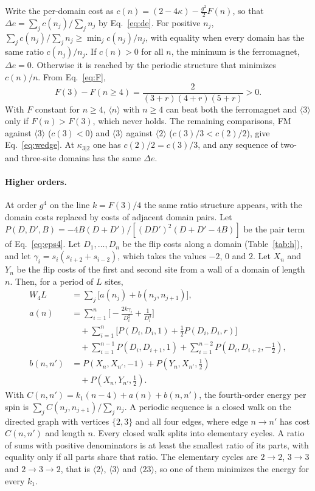 \documentclass[
 aps,prb,
 twocolumn,
 superscriptaddress,
 longbibliography,
 nofootinbib,
 floatfix
]{revtex4-2}
\begin{document}
Write the per-domain cost as $c(n)=(2-4\kappa)-\tfrac{g^2}{2}F(n)$, so that
$\Delta e=\sum_jc(n_j)/\sum_jn_j$ by Eq.~\eqref{eq:de}. For positive $n_j$,
$\sum_jc(n_j)/\sum_jn_j\ge\min_jc(n_j)/n_j$, with equality when every domain has the same ratio
$c(n_j)/n_j$. If $c(n)>0$ for all $n$, the minimum is the ferromagnet, $\Delta e=0$. Otherwise it is
reached by the periodic structure that minimizes $c(n)/n$. From Eq.~\eqref{eq:F},
\begin{equation}
F(3)-F(n\ge4)=\frac{2}{(3+r)(4+r)(5+r)}>0 .
\end{equation}
With $F$ constant for $n\ge4$, $\langle n\rangle$ with $n\ge4$ can beat both the ferromagnet and
$\langle3\rangle$ only if $F(n)>F(3)$, which never holds. The remaining comparisons, FM against
$\langle3\rangle$ ($c(3)<0$) and $\langle3\rangle$ against $\langle2\rangle$
($c(3)/3<c(2)/2$), give Eq.~\eqref{eq:wedge}. At $\kappa_{3|2}$ one has $c(2)/2=c(3)/3$, and any
sequence of two- and three-site domains has the same $\Delta e$.

\paragraph*{Higher orders.}
At order $g^4$ on the line $k=F(3)/4$ the same ratio structure appears, with the domain costs replaced by
costs of adjacent domain pairs. Let $P(D,D',B)=-4B(D+D')/[(DD')^2(D+D'-4B)]$ be the pair term of
Eq.~\eqref{eq:eps4}. Let $D_1,\dots,D_n$ be the flip costs along a domain (Table~\ref{tab:h}), and let
$\gamma_i=s_i(s_{i+2}+s_{i-2})$, which takes the values $-2$, $0$ and $2$. Let $X_n$ and $Y_n$ be the flip costs of
the first and second site from a wall of a domain of length $n$. Then, for a period of $L$ sites,
\begin{align}
W_4L&=\sum_j\big[a(n_j)+b(n_j,n_{j+1})\big],\nonumber\\
a(n)&=\sum_{i=1}^{n}\Big[-\frac{2k\gamma_i}{D_i^2}+\frac1{D_i^3}\Big]\nonumber\\
&\quad+\sum_{i=1}^{n}\Big[P(D_i,D_i,1)+\tfrac12P(D_i,D_i,r)\Big]\nonumber\\
&\quad+\sum_{i=1}^{n-1}P(D_i,D_{i+1},1)+\sum_{i=1}^{n-2}P(D_i,D_{i+2},-\tfrac12),\nonumber\\
b(n,n')&=P(X_n,X_{n'},-1)+P(Y_n,X_{n'},\tfrac12)\nonumber\\
&\quad+P(X_n,Y_{n'},\tfrac12).
\label{eq:ab}
\end{align}
With $C(n,n')=k_1(n-4)+a(n)+b(n,n')$, the fourth-order energy per spin is $\sum_jC(n_j,n_{j+1})/\sum_jn_j$.
A periodic sequence is a closed walk on the directed graph with vertices $\{2,3\}$ and all four edges, where
edge $n\to n'$ has cost $C(n,n')$ and length $n$. Every closed walk splits into elementary cycles. A ratio of
sums with positive denominators is at least the smallest ratio of its parts, with equality only if all parts
share that ratio. The elementary cycles are $2\to2$, $3\to3$ and $2\to3\to2$, that is $\langle2\rangle$,
$\langle3\rangle$ and $\langle23\rangle$, so one of them minimizes the energy for every $k_1$.
\end{document}
